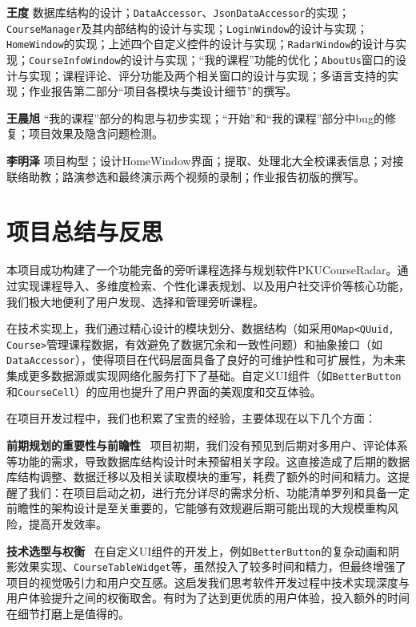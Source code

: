 \documentclass{article}
\begin{document}
\textbf{\kaishu 王度} \quad 数据库结构的设计；\texttt{DataAccessor}、\texttt{JsonDataAccessor}的实现；\texttt{CourseManager}及其内部结构的设计与实现；\texttt{LoginWindow}的设计与实现；\texttt{HomeWindow}的实现；上述四个自定义控件的设计与实现；\texttt{RadarWindow}的设计与实现；\texttt{CourseInfoWindow}的设计与实现；“我的课程”功能的优化；\texttt{AboutUs}窗口的设计与实现；课程评论、评分功能及两个相关窗口的设计与实现；多语言支持的实现；作业报告第二部分“项目各模块与类设计细节”的撰写。

\textbf{\kaishu 王晨旭} \quad “我的课程”部分的构思与初步实现；“开始”和“我的课程”部分中bug的修复；项目效果及隐含问题检测。

\textbf{\kaishu 李明泽} \quad 项目构型；设计HomeWindow界面；提取、处理北大全校课表信息；对接联络助教；路演参选和最终演示两个视频的录制；作业报告初版的撰写。

\section{项目总结与反思}
本项目成功构建了一个功能完备的旁听课程选择与规划软件PKUCourseRadar。通过实现课程导入、多维度检索、个性化课表规划、以及用户社交评价等核心功能，我们极大地便利了用户发现、选择和管理旁听课程。

在技术实现上，我们通过精心设计的模块划分、数据结构（如采用\texttt{QMap<QUuid, Course>}管理课程数据，有效避免了数据冗余和一致性问题）和抽象接口（如\texttt{DataAccessor}），使得项目在代码层面具备了良好的可维护性和可扩展性，为未来集成更多数据源或实现网络化服务打下了基础。自定义UI组件（如\texttt{BetterButton}和\texttt{CourseCell}）的应用也提升了用户界面的美观度和交互体验。

在项目开发过程中，我们也积累了宝贵的经验，主要体现在以下几个方面：

\textbf{前期规划的重要性与前瞻性} \ 项目初期，我们没有预见到后期对多用户、评论体系等功能的需求，导致数据库结构设计时未预留相关字段。这直接造成了后期的数据库结构调整、数据迁移以及相关读取模块的重写，耗费了额外的时间和精力。这提醒了我们：在项目启动之初，进行充分详尽的需求分析、功能清单罗列和具备一定前瞻性的架构设计是至关重要的，它能够有效规避后期可能出现的大规模重构风险，提高开发效率。

\textbf{技术选型与权衡} \ 在自定义UI组件的开发上，例如\texttt{BetterButton}的复杂动画和阴影效果实现、\texttt{CourseTableWidget}等，虽然投入了较多时间和精力，但最终增强了项目的视觉吸引力和用户交互感。这启发我们思考软件开发过程中技术实现深度与用户体验提升之间的权衡取舍。有时为了达到更优质的用户体验，投入额外的时间在细节打磨上是值得的。
\end{document}

